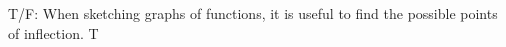 {T/F: When sketching graphs of functions, it is useful to find the possible points of inflection.
}
{T
}
